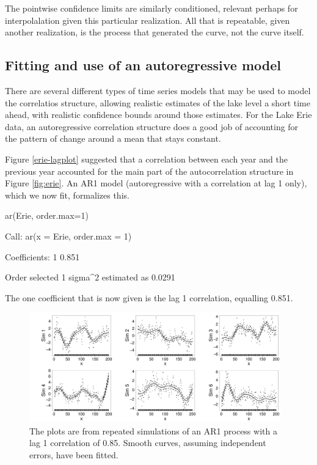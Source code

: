 The pointwise confidence limits are similarly conditioned, relevant
perhaps for interpolalation given this particular realization.
All that is repeatable, given another realization, is the
process that generated the curve, not the curve itself. 

\subsection{Fitting and use of an autoregressive model}

There are several different types of time series models that
may be used to model the correlatios structure, allowing realistic estimates of the lake level a short time ahead, with realistic
confidence bounds around those estimates.  For the Lake Erie
data, an autoregressive correlation structure does a good job of
accounting for the pattern of change around a mean that stays
constant.

Figure \ref{erie-lagplot} suggested that a correlation between each
year and the previous year accounted for the main part of the
autocorrelation structure in Figure \ref{fig:erie}. An AR1 model
(autoregressive with a correlation at lag 1 only), which we now fit,
formalizes this.
\begin{Schunk}
\begin{Sinput}
ar(Erie, order.max=1)
\end{Sinput}
\begin{Soutput}

Call:
ar(x = Erie, order.max = 1)

Coefficients:
    1  
0.851  

Order selected 1  sigma^2 estimated as  0.0291
\end{Soutput}
\end{Schunk}
The one coefficient that is now given is the lag 1 correlation,
equalling 0.851.

\begin{figure}
\begin{Schunk}


\centerline{\includegraphics[width=0.97\textwidth]{figs/9-arima-sim-1} }

\end{Schunk}
\caption{The plots are from repeated simulations of an AR1 process
with a lag 1 correlation of 0.85.  Smooth curves, assuming independent
  errors, have been fitted.}\label{fig:ar1fits}
\end{figure}


